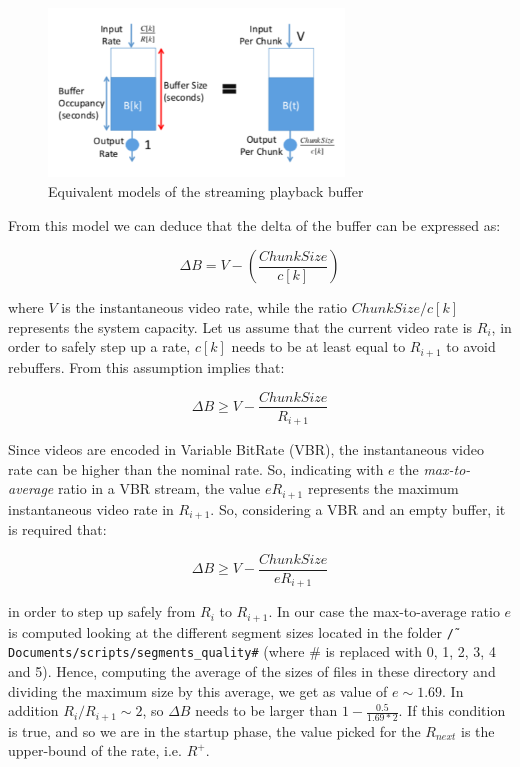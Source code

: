 \documentclass[a4paper]{report}
\begin{document}
\begin{figure}[H]
  \begin{center}
    \includegraphics[width=0.7\textwidth]{modelplaybackbuffer.png}
  \end{center}
  \caption{Equivalent models of the streaming playback buffer ~\cite{Huang:2014:BAR:2740070.2626296}}\label{playback}
\end{figure}

From this model we can deduce that the delta of the buffer can be expressed as:

\[
\Delta B = V - (\frac{ChunkSize}{c[k]})
\]

where $V$ is the instantaneous video rate, while the ratio $ChunkSize/c[k]$ represents the system capacity.
Let us assume that the current video rate is $R_i$, in order to safely step up a rate, $c[k]$ needs to be at least equal to $R_{i+1}$ to avoid rebuffers. From this assumption implies that:

\[
\Delta B \geq V - \frac{ChunkSize}{R_{i+1}}
\]

Since videos are encoded in Variable BitRate (VBR), the instantaneous video rate can be higher than the nominal rate. So, indicating with $e$ the \textit{max-to-average} ratio in a VBR stream, the value $eR_{i+1}$ represents the maximum instantaneous video rate in $R_{i+1}$. So, considering a VBR and an empty buffer, it is required that:

\[
\Delta B \geq V - \frac{ChunkSize}{eR_{i+1}}
\]

in order to step up safely from $R_{i}$ to $R_{i+1}$.
In our case the max-to-average ratio $e$ is computed looking at the different segment sizes located in the folder \texttt{\~/Documents/scripts/segments\_quality\#} (where \# is replaced with 0, 1, 2, 3, 4 and 5). Hence, computing the average of the sizes of files in these directory and dividing the maximum size by this average, we get as value of $e \sim 1.69$. In addition $R_{i} / R_{i+1} \sim 2$, so $\Delta B $ needs to be larger than $1 - \frac{0.5}{1.69*2}$. If this condition is true, and so we are in the startup phase, the value picked for the $R_{next}$ is the upper-bound of the rate, i.e. $R^+$. 
\end{document}
